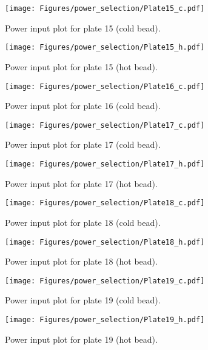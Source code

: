 \begin{figure}[htp]
   \centering
   \texttt{[image: Figures/power\_selection/Plate15\_c.pdf]}
   \caption{Power input plot for plate 15 (cold bead). }
\end{figure}


\begin{figure}[htp]
   \centering
   \texttt{[image: Figures/power\_selection/Plate15\_h.pdf]}
   \caption{Power input plot for plate 15 (hot bead). }
\end{figure}


\begin{figure}[htp]
   \centering
   \texttt{[image: Figures/power\_selection/Plate16\_c.pdf]}
   \caption{Power input plot for plate 16 (cold bead). }
\end{figure}


\begin{figure}[htp]
   \centering
   \texttt{[image: Figures/power\_selection/Plate17\_c.pdf]}
   \caption{Power input plot for plate 17 (cold bead). }
\end{figure}


\begin{figure}[htp]
   \centering
   \texttt{[image: Figures/power\_selection/Plate17\_h.pdf]}
   \caption{Power input plot for plate 17 (hot bead). }
\end{figure}


\begin{figure}[htp]
   \centering
   \texttt{[image: Figures/power\_selection/Plate18\_c.pdf]}
   \caption{Power input plot for plate 18 (cold bead). }
\end{figure}


\begin{figure}[htp]
   \centering
   \texttt{[image: Figures/power\_selection/Plate18\_h.pdf]}
   \caption{Power input plot for plate 18 (hot bead). }
\end{figure}


\begin{figure}[htp]
   \centering
   \texttt{[image: Figures/power\_selection/Plate19\_c.pdf]}
   \caption{Power input plot for plate 19 (cold bead). }
\end{figure}


\begin{figure}[htp]
   \centering
   \texttt{[image: Figures/power\_selection/Plate19\_h.pdf]}
   \caption{Power input plot for plate 19 (hot bead). }
\end{figure}


